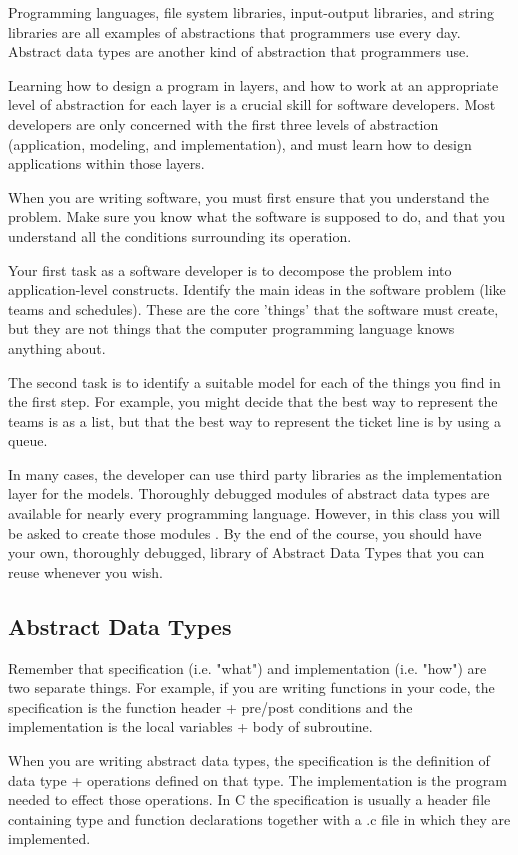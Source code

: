 Programming languages, file system libraries, input-output libraries, and string libraries are all examples of abstractions that programmers use every day. Abstract data types 
are another kind of abstraction that programmers use.

Learning how to design a program in layers, and how to work at an appropriate level of abstraction for each layer is a crucial skill for software developers. Most developers are only concerned with the first three levels of abstraction (application, modeling, and implementation), and must learn how to design applications within those layers.

When you are writing software, you must first ensure that you understand the problem. Make sure you know what the software is supposed to do, and that you understand all the conditions surrounding its operation.

Your first task as a software developer is to decompose the problem into application-level constructs. Identify the main ideas in the software problem (like teams and schedules). These are the core 'things' that the software must create, but they are not things that the computer programming language knows anything about.

The second task is to identify a suitable model for each of the things you find in the first step. For example, you might decide that the best way to represent the teams is as a list, but that the best way to represent the ticket line is by using a queue.


In many cases, the developer can use third party libraries as the implementation layer for the models. Thoroughly debugged modules of abstract data types are available for nearly every programming language.
However, in this class you will be asked to create those modules . By the end of the course, you should have your own, thoroughly debugged, library of Abstract Data Types that you can reuse whenever you wish.

\subsection{Abstract Data Types}

Remember that specification (i.e. "what") and implementation (i.e. "how") are two separate things.
For example, if you are writing functions  in your code, the specification is the function header + pre/post conditions and the implementation is the local variables + body of subroutine.

When you are writing abstract data types, the specification is the definition of data type + operations defined on that type. The implementation is the program needed to effect those operations. In C the specification is usually a header file containing type and function declarations together with a .c file in which they are implemented.

